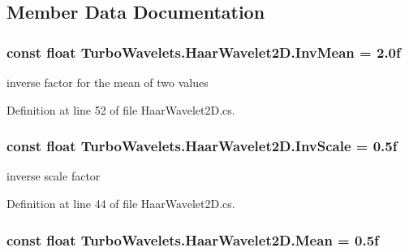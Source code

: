\subsection{\-Member \-Data \-Documentation}
\hypertarget{class_turbo_wavelets_1_1_haar_wavelet2_d_aea88909dad98e2812d5b065da35ec361}{
\subsubsection[{\-Inv\-Mean}]{\setlength{\rightskip}{0pt plus 5cm}const float {\bf \-Turbo\-Wavelets.\-Haar\-Wavelet2\-D.\-Inv\-Mean} = 2.\-0f}}\label{class_turbo_wavelets_1_1_haar_wavelet2_d_aea88909dad98e2812d5b065da35ec361}


inverse factor for the mean of two values 



\-Definition at line 52 of file \-Haar\-Wavelet2\-D.\-cs.

\hypertarget{class_turbo_wavelets_1_1_haar_wavelet2_d_ab2fa94eb968bd48292856758c241b186}{
\subsubsection[{\-Inv\-Scale}]{\setlength{\rightskip}{0pt plus 5cm}const float {\bf \-Turbo\-Wavelets.\-Haar\-Wavelet2\-D.\-Inv\-Scale} = 0.\-5f}}\label{class_turbo_wavelets_1_1_haar_wavelet2_d_ab2fa94eb968bd48292856758c241b186}


inverse scale factor 



\-Definition at line 44 of file \-Haar\-Wavelet2\-D.\-cs.

\hypertarget{class_turbo_wavelets_1_1_haar_wavelet2_d_ae874d9a5f34ead2fbf4dc8efc4fc3e70}{
\subsubsection[{\-Mean}]{\setlength{\rightskip}{0pt plus 5cm}const float {\bf \-Turbo\-Wavelets.\-Haar\-Wavelet2\-D.\-Mean} = 0.\-5f}}\label{class_turbo_wavelets_1_1_haar_wavelet2_d_ae874d9a5f34ead2fbf4dc8efc4fc3e70}


